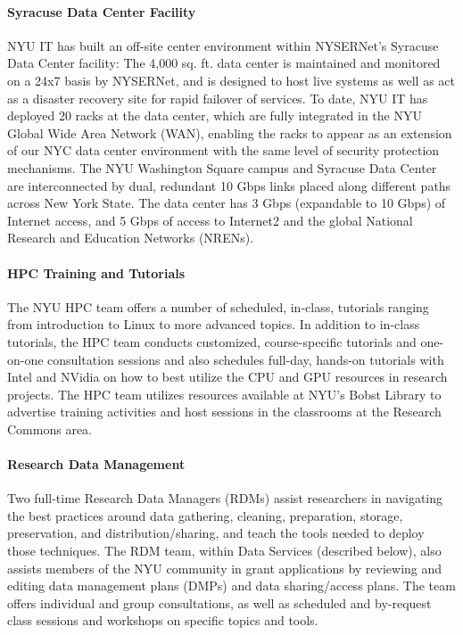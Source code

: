 \paragraph{Syracuse Data Center Facility}
NYU IT has built an off-site center environment within NYSERNet's Syracuse Data Center facility: The 4,000 sq. ft. data center is maintained and monitored on a 24x7 basis by NYSERNet, and is designed to host live systems as well as act as a disaster recovery site for rapid failover of services.  To date, NYU IT has deployed 20 racks at the data center, which are fully integrated in the NYU Global Wide Area Network (WAN), enabling the racks to appear as an extension of our NYC data center environment with the same level of security protection mechanisms. The NYU Washington Square campus and Syracuse Data Center are interconnected by dual, redundant 10 Gbps links placed along different paths across New York State.  The data center has 3 Gbps (expandable to 10 Gbps) of Internet access, and 5 Gbps of access to Internet2 and the global National Research and Education Networks (NRENs).

\paragraph{HPC Training and Tutorials}
The NYU HPC team offers a number of scheduled, in-class, tutorials ranging from introduction to Linux to more advanced topics. In addition to in-class tutorials, the HPC team conducts customized, course-specific tutorials and one-on-one consultation sessions and also schedules full-day, hands-on tutorials with Intel and NVidia on how to best utilize the CPU and GPU resources in research projects. The HPC team utilizes resources available at NYU’s Bobst Library to advertise training activities and host sessions in the classrooms at the Research Commons area.

\paragraph{Research Data Management}
Two full-time Research Data Managers (RDMs) assist researchers in navigating the best practices around data gathering, cleaning, preparation, storage, preservation, and distribution/sharing, and teach the tools needed to deploy those techniques. The RDM team, within Data Services (described below), also assists members of the NYU community in grant applications by reviewing and editing data management plans (DMPs) and data sharing/access plans. The team offers individual and group consultations, as well as scheduled and by-request class sessions and workshops on specific topics and tools.

